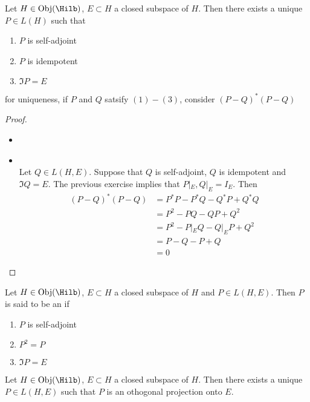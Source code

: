 \documentclass{book}
\begin{document}
\begin{ex}
	Let $H \in \Obj(\Hilb)$, $E \subset H$ a closed subspace of $H$. Then there exists a unique $P \in L(H)$ such that 
	\begin{enumerate}
		\item $P$ is self-adjoint
		\item $P$ is idempotent
		\item $\Im P = E$ 
	\end{enumerate}
	 for uniqueness, if $P$ and $Q$ satsify $(1)-(3)$, consider $(P - Q)^*(P - Q)$
\end{ex}

\begin{proof}\
	\begin{itemize}
		\item {} \\
		
		\item {} \\
		Let $Q \in L(H, E)$. Suppose that $Q$ is self-adjoint, $Q$ is idempotent and $\Im Q = E$. The previous exercise implies that $P|_E, Q|_E = I_E$. Then 
		\begin{align*}
			(P - Q)^*(P - Q)
			& = P^*P - P^*Q - Q^*P + Q^*Q \\
			& = P^2 - PQ - QP + Q^2 \\
			& = P^2 - P|_E Q - Q|_E P + Q^2 \\
			& = P - Q - P + Q \\
			& = 0
		\end{align*}
		
	\end{itemize}
\end{proof}

\begin{defn}
	Let $H \in \Obj(\Hilb)$, $E \subset H$ a closed subspace of $H$ and $P \in L(H, E)$. Then $P$ is said to be an  if 
	\begin{enumerate}
		\item $P$ is self-adjoint
		\item $P^2 = P$
		\item $\Im P = E$ 
	\end{enumerate}
\end{defn}

\begin{ex}
	Let $H \in \Obj(\Hilb)$, $E \subset H$ a closed subspace of $H$. Then there exists a unique $P \in L(H, E)$ such that $P$ is an othogonal projection onto $E$.
\end{ex}
\end{document}

